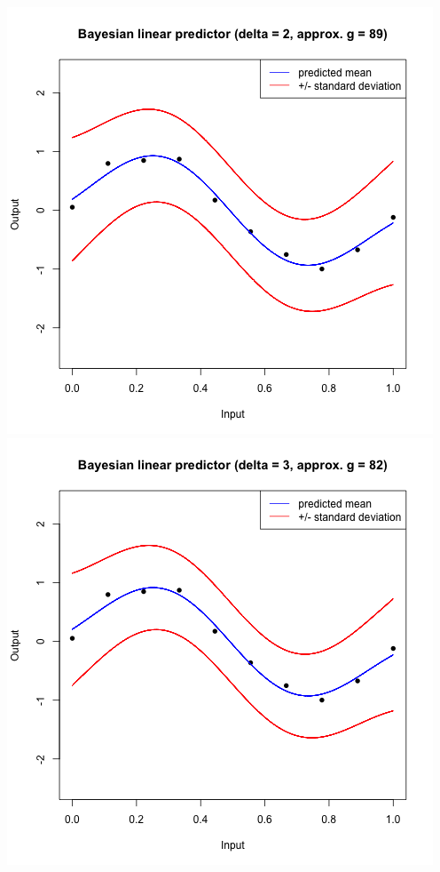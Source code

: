 \documentclass[a4paper, 11pt]{article}
\begin{document}
\begin{center}
\includegraphics[scale=0.6]{ps3F_plot5.png}
\includegraphics[scale=0.6]{ps3F_plot6.png}

\end{center}
\end{document}
